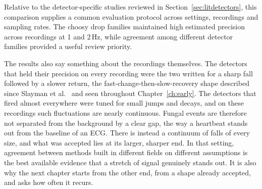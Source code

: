 Relative to the detector-specific studies reviewed in Section~\ref{sec:litdetectors}, this comparison supplies a common evaluation protocol across settings, recordings and sampling rates. The choosy drop families maintained high estimated precision across recordings at 1 and 2\,Hz, while agreement among different detector families provided a useful review priority.

The results also say something about the recordings themselves. The detectors that held their precision on every recording were the two written for a sharp fall followed by a slower return, the fast-change-then-slow-recovery shape described since Slayman et al.\ \cite{slayman} and seen throughout Chapter~\ref{ch:early}. The detectors that fired almost everywhere were tuned for small jumps and decays, and on these recordings such fluctuations are nearly continuous. Fungal events are therefore not separated from the background by a clear gap, the way a heartbeat stands out from the baseline of an ECG. There is instead a continuum of falls of every size, and what was accepted lies at its larger, sharper end. In that setting, agreement between methods built in different fields on different assumptions is the best available evidence that a stretch of signal genuinely stands out. It is also why the next chapter starts from the other end, from a shape already accepted, and asks how often it recurs.

